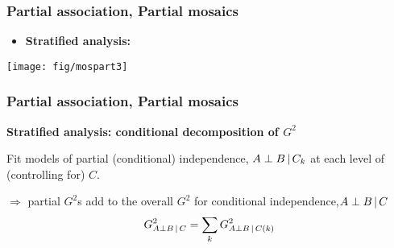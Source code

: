 \begin{frame}
  \frametitle{Partial association, Partial mosaics}
  \begin{itemize}
	\item{\large\bfseries Stratified analysis:}
  \end{itemize}
\begin{center}
  \texttt{[image: fig/mospart3]}
\end{center}

\end{frame}

\begin{frame}

  \frametitle{Partial association, Partial mosaics}
  \begin{block}{\large\bfseries Stratified analysis: conditional decomposition of $G^2$}
      \begin{itemize*}
	  \item Fit models of partial (conditional) independence, $ A \perp B \, | \, C_k$
            at each level of (controlling for) $C$.
	  \item $\Rightarrow$ partial $G^2$s add to the overall
	  $G^2$ for conditional independence,$ A \perp B \, | \, C$
\begin{equation*}
G^2_{A \perp B \, | \, C} = \sum_k G^2_{A \perp B \, | \, C(k)}
\end{equation*}
       \end{itemize*}
 \end{block}


\end{frame}

